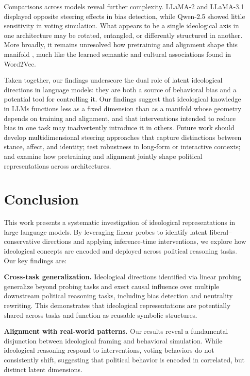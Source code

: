 \documentclass[11pt]{article}
\begin{document}
Comparisons across models reveal further complexity. LLaMA-2 and LLaMA-3.1 displayed opposite steering effects in bias detection, while Qwen-2.5 showed little sensitivity in voting simulation. What appears to be a single ideological axis in one architecture may be rotated, entangled, or differently structured in another. More broadly, it remains unresolved how pretraining and alignment shape this manifold \citep{fengPretrainingDataLanguage2023}, much like the learned semantic and cultural associations found in Word2Vec.

Taken together, our findings underscore the dual role of latent ideological directions in language models: they are both a source of behavioral bias and a potential tool for controlling it. Our findings suggest that ideological knowledge in LLMs functions less as a fixed dimension than as a manifold whose geometry depends on training and alignment, and that interventions intended to reduce bias in one task may inadvertently introduce it in others. Future work should develop multidimensional steering approaches that capture distinctions between stance, affect, and identity; test robustness in long-form or interactive contexts; and examine how pretraining and alignment jointly shape political representations across architectures.

\section{Conclusion}

This work presents a systematic investigation of ideological representations in large language models. By leveraging linear probes to identify latent liberal--conservative directions and applying inference-time interventions, we explore how ideological concepts are encoded and deployed across political reasoning tasks. Our key findings are:

\textbf{Cross-task generalization.} Ideological directions identified via linear probing generalize beyond probing tasks and exert causal influence over multiple downstream political reasoning tasks, including bias detection and neutrality rewriting. This demonstrates that ideological representations are potentially shared across tasks and function as reusable symbolic structures.
    
\textbf{Alignment with real-world patterns.} Our results reveal a fundamental disjunction between ideological framing and behavioral simulation. While ideological reasoning respond to interventions, voting behaviors do not consistently shift, suggesting that political behavior is encoded in correlated, but distinct latent dimensions.
    
\end{document}
